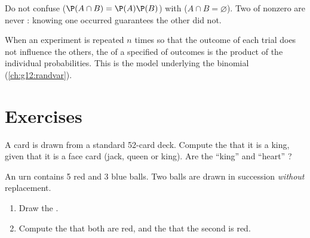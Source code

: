 \begin{remark}
Do not confuse \emph{} ($\P(A\cap B) = \P(A)\P(B)$) with
\emph{} ($A \cap B = \varnothing$). Two   of
nonzero  are never : knowing one occurred guarantees
the other did not.
\end{remark}

\begin{definition}\label{def:g12:condprob:repet}
When an experiment is repeated $n$ times so that the outcome of each trial
does not influence the others, the  of a specified  of
outcomes is the product of the individual probabilities. This is the model
underlying the binomial  (\cref{ch:g12:randvar}).
\end{definition}

\section{Exercises}

\begin{exercise}[$\star$]\label{exo:g12:condprob:1}
A card is drawn from a standard 52-card deck. Compute the  that
it is a king, given that it is a face card (jack, queen or king). Are the
 ``king'' and ``heart'' ?
\end{exercise}

\begin{exercise}[$\star$]\label{exo:g12:condprob:2}
An urn contains 5 red and 3 blue balls. Two balls are drawn in succession
\emph{without} replacement.
\begin{enumerate}
  \item Draw the  .
  \item Compute the  that both are red, and the  that
        the second is red.
\end{enumerate}
\end{exercise}

